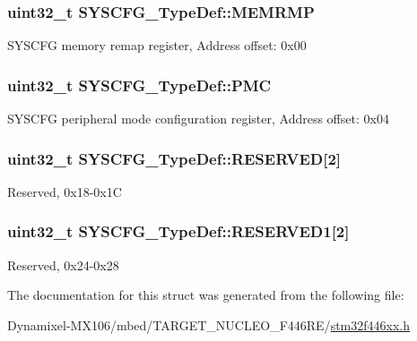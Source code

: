 \subsubsection[{\texorpdfstring{M\+E\+M\+R\+MP}{MEMRMP}}]{ uint32\+\_\+t S\+Y\+S\+C\+F\+G\+\_\+\+Type\+Def\+::\+M\+E\+M\+R\+MP}\hypertarget{struct_s_y_s_c_f_g___type_def_a85b9d3df2274b730327b181c402a7bf5}{}\label{struct_s_y_s_c_f_g___type_def_a85b9d3df2274b730327b181c402a7bf5}
S\+Y\+S\+C\+FG memory remap register, Address offset\+: 0x00 
\subsubsection[{\texorpdfstring{P\+MC}{PMC}}]{ uint32\+\_\+t S\+Y\+S\+C\+F\+G\+\_\+\+Type\+Def\+::\+P\+MC}\hypertarget{struct_s_y_s_c_f_g___type_def_ab5c47c570566cb8ff9d0436c17cc9241}{}\label{struct_s_y_s_c_f_g___type_def_ab5c47c570566cb8ff9d0436c17cc9241}
S\+Y\+S\+C\+FG peripheral mode configuration register, Address offset\+: 0x04 
\subsubsection[{\texorpdfstring{R\+E\+S\+E\+R\+V\+ED}{RESERVED}}]{\setlength{\rightskip}{0pt plus 5cm}uint32\+\_\+t S\+Y\+S\+C\+F\+G\+\_\+\+Type\+Def\+::\+R\+E\+S\+E\+R\+V\+ED\mbox{[}2\mbox{]}}\hypertarget{struct_s_y_s_c_f_g___type_def_a43926e6d31a976a0018b2d1f5c92645d}{}\label{struct_s_y_s_c_f_g___type_def_a43926e6d31a976a0018b2d1f5c92645d}
Reserved, 0x18-\/0x1C 
\subsubsection[{\texorpdfstring{R\+E\+S\+E\+R\+V\+E\+D1}{RESERVED1}}]{\setlength{\rightskip}{0pt plus 5cm}uint32\+\_\+t S\+Y\+S\+C\+F\+G\+\_\+\+Type\+Def\+::\+R\+E\+S\+E\+R\+V\+E\+D1\mbox{[}2\mbox{]}}\hypertarget{struct_s_y_s_c_f_g___type_def_a864cf277b7d9c9069372607501b47ad6}{}\label{struct_s_y_s_c_f_g___type_def_a864cf277b7d9c9069372607501b47ad6}
Reserved, 0x24-\/0x28 

The documentation for this struct was generated from the following file\+:\begin{DoxyCompactItemize}
\item 
Dynamixel-\/\+M\+X106/mbed/\+T\+A\+R\+G\+E\+T\+\_\+\+N\+U\+C\+L\+E\+O\+\_\+\+F446\+R\+E/\hyperlink{stm32f446xx_8h}{stm32f446xx.\+h}\end{DoxyCompactItemize}

